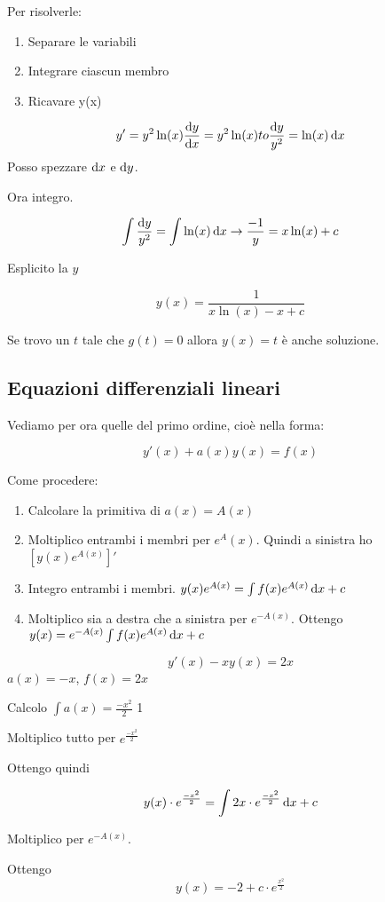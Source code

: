 Per risolverle:

\begin{enumerate}
\item Separare le variabili
\item Integrare ciascun membro
\item Ricavare y(x)
\end{enumerate}

\begin{example}
$$
y' = y^2 \ln(x) \\
\frac{\mathop{}\!\mathrm{d} y}{\mathop{}\!\mathrm{d} x} = y^2 \ln(x)  to
\frac{\mathop{}\!\mathrm{d} y}{y^2} = \ln(x) \mathop{}\!\mathrm{d} x
$$
Posso spezzare $\mathop{}\!\mathrm{d} x$ e $\mathop{}\!\mathrm{d} y$.

Ora integro.

$$
\int \frac{\mathop{}\!\mathrm{d} y}{y^2} = \int \ln(x) \mathop{}\!\mathrm{d} x \to
\frac{-1}{y} = x \ln(x) + c
$$

Esplicito la $y$

$$y(x)  = \frac{1}{x\ln(x)-x+c}$$
\end{example}

Se trovo un $t$ tale che $g(t) = 0$ allora $y(x) = t$ è anche soluzione.

\subsection{Equazioni differenziali lineari}

Vediamo per ora quelle del primo ordine, cioè nella forma:

$$y'(x) + a(x)y(x) = f(x)$$

Come procedere:

\begin{enumerate}
\item Calcolare la primitiva di $a(x) = A(x)$
\item Moltiplico entrambi i membri per $e^A(x)$. Quindi a sinistra ho $[y(x)e^{A(x)}]'$
\item Integro entrambi i membri. $y(x)e^{A(x)} = \int f(x)e^{A(x)} \mathop{}\!\mathrm{d} x +c$
\item Moltiplico sia a destra che a sinistra per $e^{-A(x)}$. Ottengo $y(x) = e^{-A(x)} \int f(x)e^{A(x)} \mathop{}\!\mathrm{d} x +c$
\end{enumerate}

\begin{example}
$$y'(x)-xy(x)=2x$$
$a(x) = -x$, $f(x) = 2x$

Calcolo $\int a(x) = \frac{-x^2}{2}$ 1

Moltiplico tutto per $e^{\frac{-x^2}{2}}$

Ottengo quindi

$$y(x)\cdot e^{\frac{-x^2}{2}} = \int 2x \cdot e^{\frac{-x^2}{2}} \mathop{}\!\mathrm{d} x + c$$

Moltiplico per $e^{-A(x)}$.

Ottengo $$y(x) = -2+c\cdot e^{\frac{x^2}{2}}$$
\end{example}

